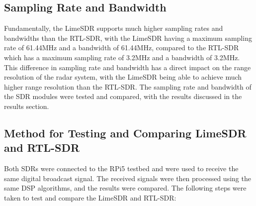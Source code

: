 \subsection{Sampling Rate and Bandwidth}
Fundamentally, the LimeSDR supports much higher sampling rates and bandwidths than the RTL-SDR, with the LimeSDR having a maximum sampling rate of 61.44MHz and a bandwidth of 61.44MHz, compared to the RTL-SDR which has a maximum sampling rate of 3.2MHz and a bandwidth of 3.2MHz. This difference in sampling rate and bandwidth has a direct impact on the range resolution of the radar system, with the LimeSDR being able to achieve much higher range resolution than the RTL-SDR. The sampling rate and bandwidth of the SDR modules were tested and compared, with the results discussed in the results section.

\subsection{Method for Testing and Comparing LimeSDR and RTL-SDR}
Both SDRs were connected to the RPi5 testbed and were used to receive the same digital broadcast signal. The received signals were then processed using the same DSP algorithms, and the results were compared. The following steps were taken to test and compare the LimeSDR and RTL-SDR:




